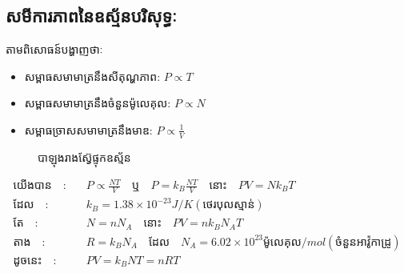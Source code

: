 	 \subsection{សមីការភាពនៃឧស្ម័នបរិសុទ្ធៈ} 
	 	\begin{multicols}{2}
	 	តាមពិសោធន៍បង្ហាញថាៈ
			\begin{itemize}
				\item សម្ពាធសមាមាត្រនឹងសីតុណ្ហភាព: \quad $P\propto T$
				\item សម្ពាធសមាមាត្រនឹងចំនួនម៉ូលេគុល: \quad $P\propto N$
				\item សម្ពាធច្រាសសមាមាត្រនឹងមាឌ: \quad $P\propto\frac{1}{V}$
			\end{itemize}
			\begin{figure}[H]
				\centering
				\caption{បាឡុងរាងស៊្វែផ្ទុកឧស្ម័ន}
			\end{figure}
		\end{multicols}
		\begin{align*}
			\text{យើងបាន}\quad :& \quad P\propto \frac{NT}{V}\quad \text{ឬ}\quad P=k_{B}\frac{NT}{V}\quad \text{នោះ}\quad PV=Nk_{B}T\\\text{ដែល}\quad :&\quad k_{B}=1.38\times10^{-23}J/K\left(\text{ថេរបុលស្មាន់}\right)\\
			\text{តែ}\quad :&\quad N=nN_{A}\quad \text{នោះ}\quad PV=nk_{B}N_{A}T\\
			\text{តាង}\quad :&\quad R=k_{B}N_{A}\quad\text{ដែល}\quad N_{A}=6.02\times10^{23}\text{ម៉ូលេគុល}/mol\left(\text{ចំនួនអាវ៉ូកាដ្រូ}\right)\\
			\text{ដូចនេះ}\quad :&\quad PV=k_{B}NT=nRT
		\end{align*}
